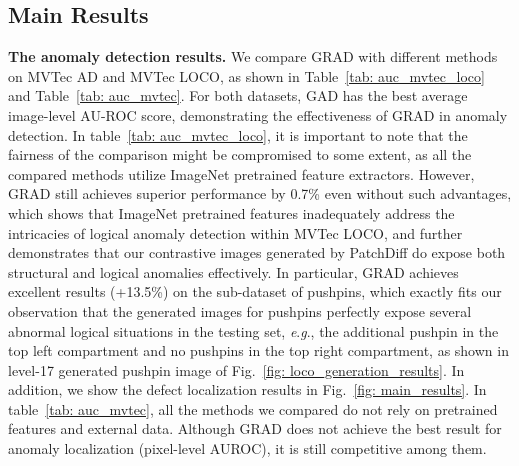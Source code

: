\documentclass[letterpaper]{article} %
\newcommand{\eg}{\textit{e}.\textit{g}.}
\begin{document}
\begin{table}[htbp]
\centering
\setlength{\belowcaptionskip}{0.0cm}
\setlength{\abovecaptionskip}{0.1cm}
\resizebox{0.9\linewidth}{!}{
\begin{tabular}{lcc}
\toprule
Method & \makecell[c]{Pixel-level\\AU-ROC} & \makecell[c]{Image-level\\AU-ROC} \\
\midrule
IGD\tiny{~\citep{IGD}} & 93.1 & 93.4 \\
PSVDD\tiny{~\citep{PSVDD}} & 92.5 & 93.2 \\
FCDD\tiny{~\citep{FCDD}} & 92.1 & 95.7 \\
CutPaste\tiny{~\citep{CutPaste}} & 95.2 & 96.0 \\
NSA\tiny{~\citep{NSA}} & 96.3 & 97.2 \\
DRAEM\tiny{~\citep{DRAEM}} & \textbf{97.3} & 98.0 \\
DSR\tiny{~\citep{DSR}} & - & 98.2 \\
\rowcolor{gray!20} GRAD \tiny{(Ours)} & 96.8 & \textbf{98.7} \\
\bottomrule
\end{tabular}}
\caption{Anomaly detection performance on MVTec AD dataset~\cite{MVTecAD}. The best results are in bold.}
\label{tab: auc_mvtec}
\end{table}

\subsection{Main Results}

\noindent\textbf{The anomaly detection results.} We compare GRAD with different methods on MVTec AD and MVTec LOCO, as shown in Table~\ref{tab: auc_mvtec_loco} and Table~\ref{tab: auc_mvtec}. For both datasets, GAD has the best average image-level AU-ROC score, demonstrating the effectiveness of GRAD in anomaly detection. In table~\ref{tab: auc_mvtec_loco}, it is important to note that the fairness of the comparison might be compromised to some extent, as all the compared methods utilize ImageNet pretrained feature extractors. However, GRAD still achieves superior performance by 0.7\% even without such advantages, which shows that ImageNet pretrained features inadequately address the intricacies of logical anomaly detection within MVTec LOCO, and further demonstrates that our contrastive images generated by PatchDiff do expose both structural and logical anomalies effectively. In particular, GRAD achieves excellent results (+13.5\%) on the sub-dataset of pushpins, which exactly fits our observation that the generated images for pushpins perfectly expose several abnormal logical situations in the testing set, \eg, the additional pushpin in the top left compartment and no pushpins in the top right compartment, as shown in level-17 generated pushpin image of Fig.~\ref{fig: loco_generation_results}. In addition, we show the defect localization results in Fig.~\ref{fig: main_results}. In table~\ref{tab: auc_mvtec}, all the methods we compared do not rely on pretrained features and external data. Although GRAD does not achieve the best result for anomaly localization (pixel-level AUROC), it is still competitive among them.
\end{document}
